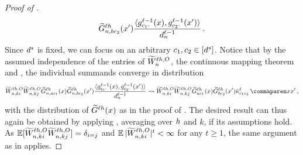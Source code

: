 \begin{proof}[Proof of ]
\begin{align*}
            \widetilde{G}_{n, b c_2}^{\ell h} (x')
            \frac{
                \langle
                    {g}^{\ell - 1}_{c_1 \cdot}{(x)}
                    ,
                    {g}^{\ell - 1}_{c_2 \cdot}{(x')}
                \rangle
            }{
                d_{n}^{\ell - 1}
            }
        \, .
    \end{align*}
    Since $d^s$ is fixed, we can focus on an arbitrary $c_1, c_2 \in [d^s]$.
    Notice that by the assumed independence of the entries of $\widetilde{W}_{n}^{\ell h, O}$, the continuous mapping theorem and , the individual summands converge in distribution
    $$
        \uW_{\sequenceVariable, k i}^{\depthSymbol\headIndex, \outputSymbol}
        \uW_{\sequenceVariable, k j}^{\depthSymbol\headIndex, \outputSymbol}
        \tildeLogitN{\sequenceVariable, \fIndexA c_1}{\depthSymbol\headIndex}{\inputSymbol}
        \tildeLogitN{\sequenceVariable, \fIndexB c_2}{\depthSymbol\headIndex}{\inputSymbol'}
        \frac{
            \langle
                \indexedActivity{\depthSymbol - 1}{c_1 \cdot}{\inputSymbol}
                ,
                \indexedActivity{\depthSymbol - 1}{c_2 \cdot}{\inputSymbol'}
            \rangle
        }{
            \layerDimension{\depthSymbol - 1}
        }
        \convergeDist
        \uW_{\sequenceVariable, k i}^{\depthSymbol\headIndex, \outputSymbol}
        \uW_{\sequenceVariable, k j}^{\depthSymbol\headIndex, \outputSymbol}
        \tildeLogitN{\fIndexA c_1}{\depthSymbol\headIndex}{\inputSymbol}
        \tildeLogitN{\fIndexB c_2}{\depthSymbol\headIndex}{\inputSymbol'}
        \kerntildef{c_1 c_2}{\depthSymbol}{\inputSymbol}{\inputSymbol'}
        \, ,
    $$
    with the distribution of
    $\widetilde{G}_{}^{\ell h} (x)$
    as in the proof of .
    The desired result can thus again be obtained by applying , averaging over $h$ and $k$, if its assumptions hold.
    As $\operatorname*{\mathbb{E}} [\widetilde{W}_{n , k i}^{\ell h, O} \widetilde{W}_{n, k j}^{\ell h, O}] = \delta_{i = j}$ and $\operatorname*{\mathbb{E}} |\widetilde{W}_{n , k i}^{\ell h, O}|^t < \infty$ for any $t \geq 1$, the same argument as in  applies.
\end{proof}


